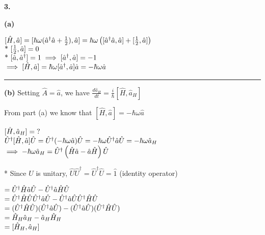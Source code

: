 \documentclass[14pt]{extarticle}
\makeatletter
\newenvironment{lefteqs}{%
    \begin{flushleft}%
    \renewcommand{\arraystretch}{1.3}%
    $\begin{array}{@{}l@{}}%
}{%
    \end{array}$%
    \end{flushleft}%
}
\makeatother
\begin{document}
\newpage

\textbf{\large 3.}

\textbf{(a)}
\begin{lefteqs}
    [\hat{H}, \hat{a}] = [\hbar \omega (\hat{a}^\dagger \hat{a} + \frac{1}{2}), \hat{a}]
    = \hbar \omega \left( [\hat{a}^\dagger \hat{a}, \hat{a}] + [\frac{1}{2}, \hat{a}] \right) \\
    \text{* } [\frac{1}{2}, \hat{a}] = 0 \\
    \text{* } [\hat{a}, \hat{a}^\dagger] = 1 \implies [\hat{a}^\dagger, \hat{a}] = -1 \\
    \implies [\hat{H}, \hat{a}] = \hbar \omega [\hat{a}^\dagger, \hat{a}] \hat{a}  = -\hbar \omega \hat{a}
\end{lefteqs}

\hrule
\vspace{2em}

\textbf{(b)}
Setting $\hat{A} = \hat{a}$, we have $\frac{d \hat{a}_H}{dt} = \frac{i}{\hbar} [\hat{H}, \hat{a}_H]$

From part (a) we know that $[\hat{H}, \hat{a}] = -\hbar \omega \hat{a}$
\begin{lefteqs}
    [\hat{H}, \hat{a}_H] = \text{?} \\
    \hat{U}^\dagger [\hat{H}, \hat{a}] \hat{U} = \hat{U}^\dagger (-\hbar \omega \hat{a}) \hat{U} = -\hbar \omega \hat{U}^\dagger \hat{a} \hat{U} = -\hbar \omega \hat{a}_H \\
    \implies -\hbar \omega \hat{a}_H = \hat{U}^\dagger \left( \hat{H} \hat{a} - \hat{a} \hat{H} \right) \hat{U}
\end{lefteqs}

* Since $U$ is unitary, $\hat{U} \hat{U}^\dagger = \hat{U}^\dagger \hat{U} = \hat{1}$ (identity operator)

\begin{lefteqs}
    = \hat{U}^\dagger \hat{H} \hat{a} \hat{U} - \hat{U}^\dagger \hat{a} \hat{H} \hat{U} \\
    = \hat{U}^\dagger \hat{H} \hat{U} \hat{U}^\dagger \hat{a} \hat{U} - \hat{U}^\dagger \hat{a} \hat{U} \hat{U}^\dagger \hat{H} \hat{U} \\
    = (\hat{U}^\dagger \hat{H} \hat{U}) (\hat{U}^\dagger \hat{a} \hat{U}) - (\hat{U}^\dagger \hat{a} \hat{U}) (\hat{U}^\dagger \hat{H} \hat{U}) \\
    = \hat{H}_H \hat{a}_H - \hat{a}_H \hat{H}_H \\
    = [\hat{H}_H, \hat{a}_H]
\end{lefteqs}
\end{document}
